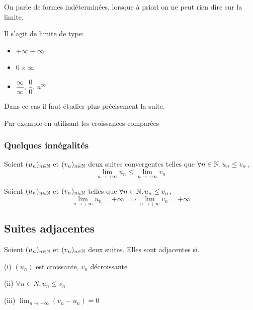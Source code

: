 \documentclass[a4paper, 12pt]{article}
\begin{document}
On parle de formes indéterminées, lorsque à priori on ne peut rien dire sur la limite.

Il s'agit de limite de type:

\begin{itemize}
    \item $+\infty -\infty$
    \item $0 \times \infty$
    \item $\dfrac{\infty}{\infty}$, $\dfrac{0}{0}$, $a^\infty$
\end{itemize}

Dans ce cas il faut étudier plus précisement la suite.

Par exemple en utilisant les croissances comparées

\subsubsection{Quelques innégalités}

\begin{proprietes}
    \item Soient $(u_n)_{n \in \mathbb{N}}$ et $(v_n)_{n \in \mathbb{N}}$ deux suites convergentes telles que $\forall n \in \mathbb{N}, u_n \leq v_n$,
    $$
    \lim_{n \to +\infty}u_n \leq \lim_{n \to +\infty}v_n
    $$
    \item Soient $(u_n)_{n \in \mathbb{N}}$ et $(v_n)_{n \in \mathbb{N}}$ telles que $\forall n \in \mathbb{N}, u_n \leq v_n$,
    $$
    \lim_{n \to +\infty}u_n = +\infty \implies \lim_{n \to +\infty}v_n = +\infty
    $$
\end{proprietes}







\subsection{Suites adjacentes}

\begin{definition}
    Soient $(u_n)_{n \in \mathbb{N}}$ et $(v_n)_{n \in \mathbb{N}}$ deux suites. Elles sont adjacentes si.

    \item (i) $(u_n)$ est croissante, $v_n$ décroissante
    \item (ii) $\forall n \in N, u_n \leq v_n$
    \item (iii) $\lim_{n \to +\infty} (v_n - u_n) = 0$
\end{definition}
\end{document}
